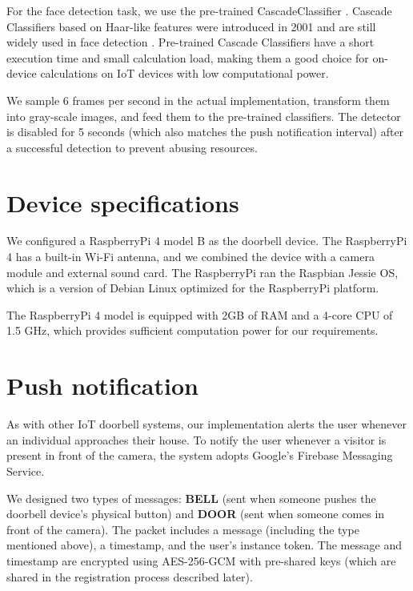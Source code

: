 For the face detection task, we use the pre-trained CascadeClassifier \cite{viola2001rapid}. Cascade Classifiers based on Haar-like features were introduced in 2001 and are still widely used in face detection \cite{sharifara2014general}. Pre-trained Cascade Classifiers have a short execution time and small calculation load, making them a good choice for on-device calculations on IoT devices with low computational power.

We sample 6 frames per second in the actual implementation, transform them into gray-scale images, and feed them to the pre-trained classifiers. The detector is disabled for 5 seconds (which also matches the push notification interval) after a successful detection to prevent abusing resources. 

\section{Device specifications}
We configured a RaspberryPi 4 model B as the doorbell device. The RaspberryPi 4 has a built-in Wi-Fi antenna, and we combined the device with a camera module and external sound card. The RaspberryPi ran the Raspbian Jessie OS, which is a version of Debian Linux optimized for the RaspberryPi platform.

The RaspberryPi 4 model is equipped with  2GB of RAM and a 4-core CPU of 1.5 GHz, which provides sufficient computation power for our requirements.

\section{Push notification}
As with other IoT doorbell systems, our implementation alerts the user whenever an individual approaches their house. To notify the user whenever a visitor is present in front of the camera, the system adopts Google's Firebase Messaging Service.

We designed two types of messages: \textbf{BELL} (sent when someone pushes the doorbell device’s physical button) and \textbf{DOOR} (sent when someone comes in front of the camera). The packet includes a message (including the type mentioned above), a timestamp, and the user's instance token. The message and timestamp are encrypted using AES-256-GCM with pre-shared keys (which are shared in the registration process described later).

